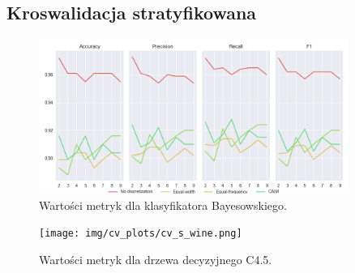 \subsection*{Kroswalidacja stratyfikowana}

\begin{figure}[H]
\center
    \includegraphics[width=0.9\textwidth]{img/cv_scores_stratifiedkfold/scoring_stratifiedkfold_wine.png}
    \caption{Wartości metryk dla klasyfikatora Bayesowskiego.}
\end{figure}

\begin{figure}[H]
    \center
    \texttt{[image: img/cv\_plots/cv\_s\_wine.png]}
    \caption{Wartości metryk dla drzewa decyzyjnego C4.5.}
\end{figure}

